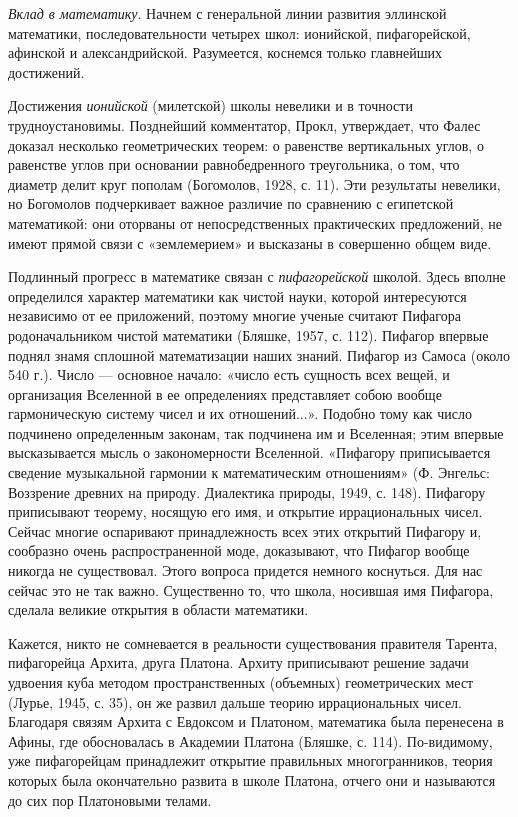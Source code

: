 \emph{Вклад  в  математику}.  Начнем   с  генеральной  линии  развития
эллинской  математики,  последовательности  четырех  школ:  ионийской,
пифагорейской, афинской и александрийской. Разумеется, коснемся только
главнейших достижений.

Достижения \emph{ионийской}  (милетской) школы  невелики и  в точности
трудноустановимы. Позднейший комментатор, Прокл, утверждает, что Фалес
доказал  несколько  геометрических  теорем: о  равенстве  вертикальных
углов, о равенстве углов при основании равнобедренного треугольника, о
том,  что диаметр  делит круг  пополам (Богомолов,  1928, с.  11). Эти
результаты  невелики, но  Богомолов  подчеркивает  важное различие  по
сравнению с  египетской математикой: они оторваны  от непосредственных
практических  предложений, не  имеют  прямой связи  с «землемерием»  и
высказаны в совершенно общем виде.

Подлинный прогресс в математике  связан с \emph{пифагорейской} школой.
Здесь вполне определился характер математики как чистой науки, которой
интересуются  независимо  от  ее  приложений,  поэтому  многие  ученые
считают Пифагора  родоначальником чистой математики (Бляшке,  1957, с.
112).  Пифагор  впервые  поднял  знамя  сплошной  математизации  наших
знаний. Пифагор из  Самоса (около 540 г.). Число  --- основное начало:
«число  есть  сущность  всех  вещей,  и  организация  Вселенной  в  ее
определениях представляет  собою вообще гармоническую систему  чисел и
их  отношений...».  Подобно  тому  как  число  подчинено  определенным
законам,  так подчинена  им  и Вселенная;  этим впервые  высказывается
мысль  о закономерности  Вселенной.  «Пифагору приписывается  сведение
музыкальной  гармонии   к  математическим  отношениям»   (Ф.  Энгельс:
Воззрение   древних  на   природу.   Диалектика   природы,  1949,   с.
148).  Пифагору  приписывают  теорему,  носящую его  имя,  и  открытие
иррациональных  чисел. Сейчас  многие  оспаривают принадлежность  всех
этих  открытий  Пифагору  и, сообразно  очень  распространенной  моде,
доказывают, что  Пифагор вообще никогда не  существовал. Этого вопроса
придется  немного  коснуться.  Для  нас   сейчас  это  не  так  важно.
Существенно  то, что  школа,  носившая имя  Пифагора, сделала  великие
открытия в области математики.

Кажется,  никто не  сомневается в  реальности существования  правителя
Тарента,  пифагорейца   Архита,  друга  Платона.   Архиту  приписывают
решение  задачи  удвоения  куба  методом  пространственных  (объемных)
геометрических мест (Лурье,  1945, с. 35), он же  развил дальше теорию
иррациональных чисел.  Благодаря связям Архита с  Евдоксом и Платоном,
математика  была  перенесена  в  Афины, где  обосновалась  в  Академии
Платона (Бляшке,  с. 114).  По-видимому, уже  пифагорейцам принадлежит
открытие правильных  многогранников, теория которых  была окончательно
развита  в  школе  Платона,  отчего   они  и  называются  до  сих  пор
Платоновыми телами.

